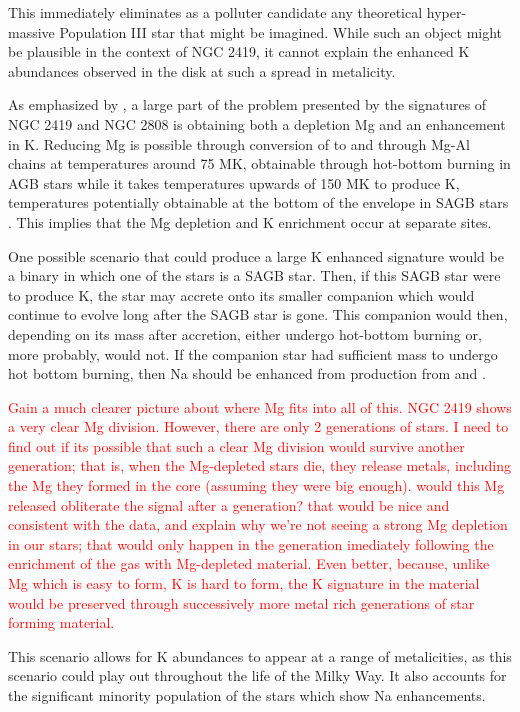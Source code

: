 \documentclass[a4paper,fleqn,usenatbib]{mnras}
\newcommand{\todo}[1]{\textcolor{red}{#1}}
\begin{document}
This immediately eliminates as a polluter candidate any theoretical hyper-massive Population III star that might be imagined. While such an object might be plausible in the context of NGC 2419, it cannot explain the enhanced K abundances observed in the disk at such a spread in metalicity.

As emphasized by \cite{prantzos2017}, a large part of the problem presented by the signatures of NGC 2419 and NGC 2808 is obtaining both a depletion Mg and an enhancement in K. Reducing Mg is possible through conversion of  to  and through Mg-Al chains at temperatures around 75 MK, obtainable through hot-bottom burning in AGB stars while it takes temperatures upwards of 150 MK to produce K, temperatures potentially obtainable at the bottom of the envelope in SAGB stars \citep{iliadis2016}. This implies that the Mg depletion and K enrichment occur at separate sites.

One possible scenario that could produce a large K enhanced signature would be a binary in which one of the stars is a SAGB star. Then, if this SAGB star were to produce K, the star may accrete onto its smaller companion which would continue to evolve long after the SAGB star is gone. This companion would then, depending on its mass after accretion, either undergo hot-bottom burning or, more probably, would not. If the companion star had sufficient mass to undergo hot bottom burning, then Na should be enhanced from production from  and .

\todo{Gain a much clearer picture about where Mg fits into all of this. NGC 2419 shows a very clear Mg division. However, there are only 2 generations of stars. I need to find out if its possible that such a clear Mg division would survive another generation; that is, when the Mg-depleted stars die, they release metals, including the Mg they formed in the core (assuming they were big enough). would this Mg released obliterate the signal after a generation? that would be nice and consistent with the data, and explain why we're not seeing a strong Mg depletion in our stars; that would only happen in the generation imediately following the enrichment of the gas with Mg-depleted material. Even better, because, unlike Mg which is easy to form, K is hard to form, the K signature in the material would be preserved through successively more metal rich generations of star forming material.}

This scenario allows for K abundances to appear at a range of metalicities, as this scenario could play out throughout the life of the Milky Way. It also  accounts for the significant minority population of the stars which show Na enhancements.
\end{document}
